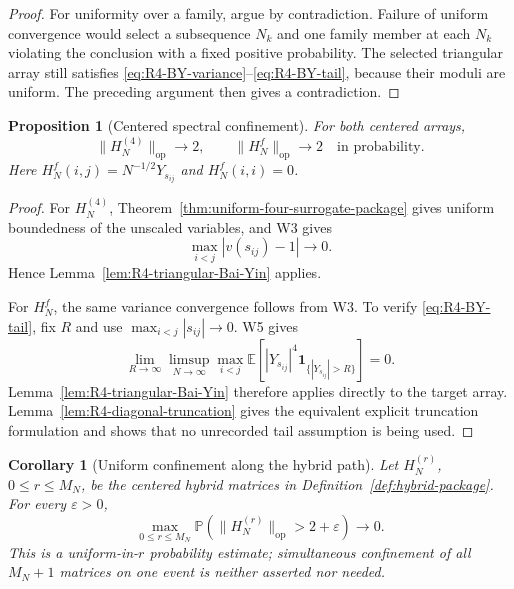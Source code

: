 \documentclass[11pt]{article}
\newtheorem{proposition}[theorem]{Proposition}
\newtheorem{corollary}[theorem]{Corollary}
\theoremstyle{definition}
\theoremstyle{remark}
\newcommand{\E}{\mathbb E}
\newcommand{\op}{\mathrm{op}}
\newcommand{\one}{\mathbf 1}
\newcommand{\norm}[1]{\lVert #1\rVert}
\begin{document}
\begin{proof}
For uniformity over a family, argue by contradiction.  Failure of uniform
convergence would select a subsequence \(N_k\) and one family member at each
\(N_k\) violating the conclusion with a fixed positive probability.  The
selected triangular array still satisfies
\eqref{eq:R4-BY-variance}--\eqref{eq:R4-BY-tail}, because their moduli are
uniform.  The preceding argument then gives a contradiction.
\end{proof}

\begin{proposition}[Centered spectral confinement]
\label{prop:R4-centered-confinement}
For both centered arrays,
\begin{equation}\label{eq:R4-norm-convergence}
 \norm{H_N^{(4)}}_{\op}\longrightarrow2,
 \qquad
 \norm{H_N^f}_{\op}\longrightarrow2
 \quad\text{in probability}.
\end{equation}
Here \(H_N^f(i,j)=N^{-1/2}Y_{s_{ij}}\) and \(H_N^f(i,i)=0\).
\end{proposition}

\begin{proof}
For \(H_N^{(4)}\), Theorem~\ref{thm:uniform-four-surrogate-package} gives
uniform boundedness of the unscaled variables, and W3 gives
\[
 \max_{i<j}|v(s_{ij})-1|\longrightarrow0.
\]
Hence Lemma~\ref{lem:R4-triangular-Bai-Yin} applies.

For \(H_N^f\), the same variance convergence follows from W3.  To verify
\eqref{eq:R4-BY-tail}, fix \(R\) and use
\(\max_{i<j}|s_{ij}|\to0\).  W5 gives
\[
 \lim_{R\to\infty}\limsup_{N\to\infty}
 \max_{i<j}
 \E\!\left[|Y_{s_{ij}}|^4
 \one_{\{|Y_{s_{ij}}|>R\}}\right]=0.
\]
Lemma~\ref{lem:R4-triangular-Bai-Yin} therefore applies directly to the
target array.  Lemma~\ref{lem:R4-diagonal-truncation} gives the equivalent
explicit truncation formulation and shows that no unrecorded tail assumption
is being used.
\end{proof}

\begin{corollary}[Uniform confinement along the hybrid path]
\label{cor:R4-hybrid-confinement}
Let \(H_N^{(r)}\), \(0\le r\le M_N\), be the centered hybrid matrices in
Definition~\ref{def:hybrid-package}.  For every \(\varepsilon>0\),
\begin{equation}\label{eq:R4-uniform-hybrid-confinement}
 \max_{0\le r\le M_N}
 \mathbb P\!\left(\norm{H_N^{(r)}}_{\op}>2+\varepsilon\right)
 \longrightarrow0.
\end{equation}
This is a uniform-in-\(r\) probability estimate; simultaneous confinement of
all \(M_N+1\) matrices on one event is neither asserted nor needed.
\end{corollary}
\end{document}
